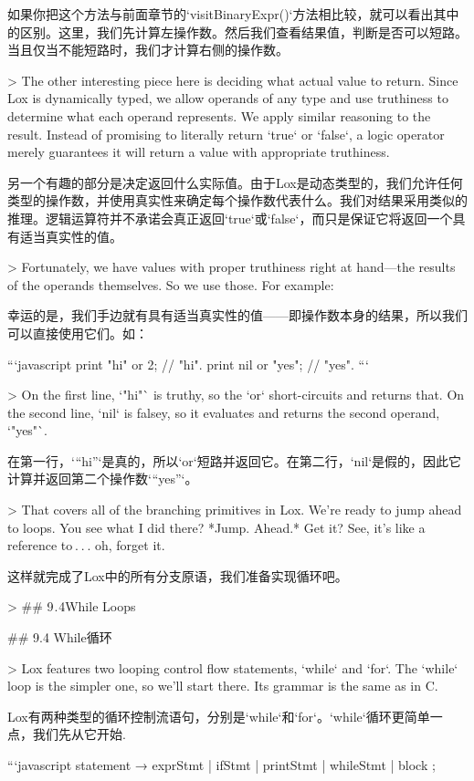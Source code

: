 \documentclass[cn,11pt,chinese]{elegantbook}
\begin{document}
{{{{如果你把这个方法与前面章节的`visitBinaryExpr()`方法相比较，就可以看出其中的区别。这里，我们先计算左操作数。然后我们查看结果值，判断是否可以短路。当且仅当不能短路时，我们才计算右侧的操作数。

> The other interesting piece here is deciding what actual value to return. Since Lox is dynamically typed, we allow operands of any type and use truthiness to determine what each operand represents. We apply similar reasoning to the result. Instead of promising to literally return `true` or `false`, a logic operator merely guarantees it will return a value with appropriate truthiness.

另一个有趣的部分是决定返回什么实际值。由于Lox是动态类型的，我们允许任何类型的操作数，并使用真实性来确定每个操作数代表什么。我们对结果采用类似的推理。逻辑运算符并不承诺会真正返回`true`或`false`，而只是保证它将返回一个具有适当真实性的值。

> Fortunately, we have values with proper truthiness right at hand—the results of the operands themselves. So we use those. For example:

幸运的是，我们手边就有具有适当真实性的值——即操作数本身的结果，所以我们可以直接使用它们。如：

```javascript
print "hi" or 2; // "hi".
print nil or "yes"; // "yes".
```

> On the first line, `"hi"` is truthy, so the `or` short-circuits and returns that. On the second line, `nil` is falsey, so it evaluates and returns the second operand, `"yes"`.

在第一行，`“hi”`是真的，所以`or`短路并返回它。在第二行，`nil`是假的，因此它计算并返回第二个操作数`“yes”`。

> That covers all of the branching primitives in Lox. We’re ready to jump ahead to loops. You see what I did there? *Jump. Ahead.* Get it? See, it’s like a reference to . . . oh, forget it.

这样就完成了Lox中的所有分支原语，我们准备实现循环吧。

> ## 9 . 4While Loops

## 9.4 While循环

> Lox features two looping control flow statements, `while` and `for`. The `while` loop is the simpler one, so we’ll start there. Its grammar is the same as in C.

Lox有两种类型的循环控制流语句，分别是`while`和`for`。`while`循环更简单一点，我们先从它开始.

```javascript
statement      → exprStmt
               | ifStmt
               | printStmt
               | whileStmt
               | block ;

}}}}
\end{document}
